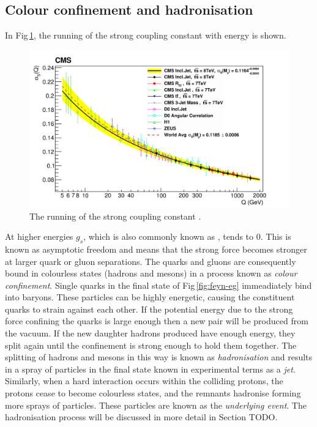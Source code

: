 \subsection{Colour confinement and hadronisation} %
\label{sub:confinement}
In Fig\,\ref{fig:alphaSrunning}, the running of the strong coupling constant with energy is shown.
\begin{figure}[h!]
	\centering
	\includegraphics[width=\textwidth]{Figures/alphaS}
	\caption[The running of the strong coupling constant]{The running of the strong coupling constant \cite{alphaSrunning}.}
	\label{fig:alphaSrunning}
\end{figure}
At higher energies $g_{s}$, which is also commonly known as \alpS{}, tends to 0.
This is known as asymptotic freedom and means that the strong force becomes stronger at larger quark or gluon separations.
The quarks and gluons are consequently bound in colourless states (hadrons and mesons) in a process known as \textit{colour confinement}.
Single quarks in the final state of Fig\,\ref{fig:feyn-eg} immeadiately bind into baryons.
These particles can be highly energetic, causing the constituent quarks to strain against each other.
If the potential energy due to the strong force confining the quarks is large enough then a new \qqbar{} pair will be produced from the vacuum. 
If the new daughter hadrons produced have enough energy, they split again until the confinement is strong enough to hold them together.
The splitting of hadrons and mesons in this way is known as \textit{hadronisation} and results in a spray of particles in the final state known in experimental terms as a \textit{jet}.
Similarly, when a hard interaction occurs within the colliding protons, the protons cease to become colourless states, and the remnants hadronise forming more sprays of particles.
These particles are known as the \textit{underlying event}.
The hadronisation process will be discussed in more detail in Section TODO.
